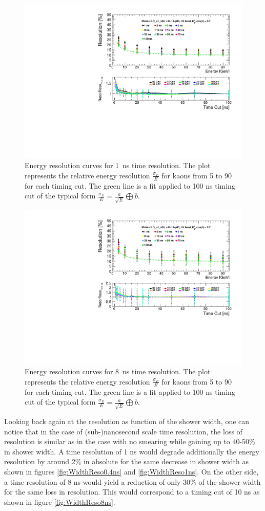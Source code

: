 \begin{figure}[htbp!]
  \centering
  \includegraphics[width=0.7\linewidth]{../Thesis_Plots/ILD/Smearing_1ns/Plots/ShowerResoAbsolute_TimeCuts_Smearing2}
  \caption{Energy resolution curves for \SI{1}{\nano\second} time resolution. The plot represents the relative energy resolution $\frac{\sigma_{E}}{E}$ for kaons from 5 to 90 \GeV for each timing cut. The green line is a fit applied to 100 ns timing cut of the typical form $\frac{\sigma_{E}}{E} = \frac{a}{\sqrt{E}} \bigoplus b$.} \label{fig:Reso1ns}
\end{figure}

\begin{figure}[htbp!]
  \centering
  \includegraphics[width=0.7\linewidth]{../Thesis_Plots/ILD/Smearing_8ns/Plots/ShowerResoAbsolute_TimeCuts_Smearing3}
  \caption{Energy resolution curves for \SI{8}{\nano\second} time resolution. The plot represents the relative energy resolution $\frac{\sigma_{E}}{E}$ for kaons from 5 to 90 \GeV for each timing cut. The green line is a fit applied to 100 ns timing cut of the typical form $\frac{\sigma_{E}}{E} = \frac{a}{\sqrt{E}} \bigoplus b$.}  \label{fig:Reso8ns}
\end{figure}

Looking back again at the resolution as function of the shower width, one can notice that in the case of (sub-)nanosecond scale time resolution, the loss of resolution is similar as in the case with no smearing while gaining up to 40-50\% in shower width. A time resolution of 1 ns would degrade additionally the energy resolution by around 2\% in absolute for the same decrease in shower width as shown in figures \ref{fig:WidthReso0.4ns} and \ref{fig:WidthReso1ns}. On the other side, a time resolution of 8 ns would yield a reduction of only 30\% of the shower width for the same loss in resolution. This would correspond to a timing cut of 10 ns as shown in figure \ref{fig:WidthReso8ns}.\\

